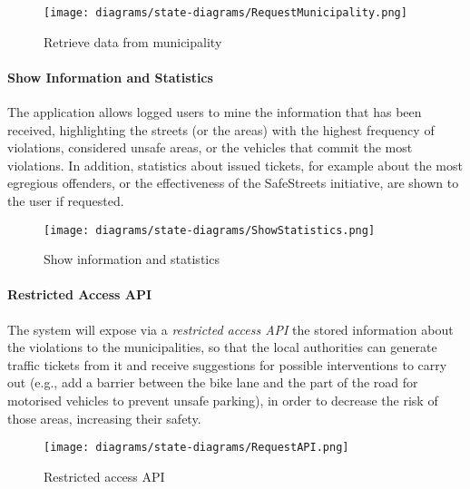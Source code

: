 	\begin{figure}[h]
		\centering
		\texttt{[image: diagrams/state-diagrams/RequestMunicipality.png]}
		\caption{
			\label{fig:retrieveMunicipality} Retrieve data from municipality
		}
	\end{figure}
	
\clearpage

\paragraph{Show Information and Statistics}
The application allows logged users to mine the information that has been received, highlighting the streets (or the areas) with the highest frequency of violations, considered unsafe areas, or the vehicles that commit the most violations. In addition, statistics about issued tickets, for example about the most egregious offenders, or the effectiveness of the SafeStreets initiative, are shown to the user if requested. \newline
	\begin{figure}[h]
		\centering
		\texttt{[image: diagrams/state-diagrams/ShowStatistics.png]}
		\caption{
			\label{fig:showStatistics} Show information and statistics
		}
	\end{figure}
	
\paragraph{Restricted Access API}
The system will expose via a \emph{restricted access API} the stored information about the violations to the municipalities, so that the local authorities can generate traffic tickets from it and receive suggestions for possible interventions to carry out (e.g., add a barrier between the bike lane and the part of the road for motorised vehicles to prevent unsafe parking), in order to decrease the risk of those areas, increasing their safety. \newline
	\begin{figure}[h]
		\centering
		\texttt{[image: diagrams/state-diagrams/RequestAPI.png]}
		\caption{
			\label{fig:restrictedAPI} Restricted access API
		}
	\end{figure}



